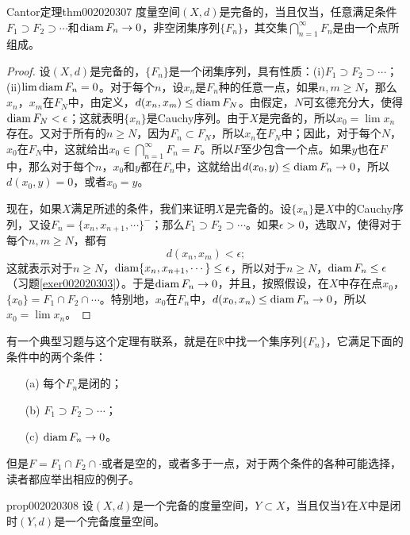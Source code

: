\begin{theorem}{Cantor定理}{thm002020307}
度量空间$(X, d)$是完备的，当且仅当，任意满足条件$F_1 \supset F_2 \supset \cdots$和$\operatorname{diam}{F_n} \to 0$，非空闭集序列$\{F_n\}$，其交集$\bigcap_{n=1}^{\infty}{F_n}$是由一个点所组成。
\end{theorem}

\begin{proof}
设$(X, d)$是完备的，$\{F_n\}$是一个闭集序列，具有性质：(i)$F_1 \supset F_2 \supset \cdots$；(ii)$\lim{\operatorname{diam}{F_n}} = 0$。对于每个$n$，设$x_n$是$F_n$种的任意一点，如果$n, m \ge N$，那么$x_n$，$x_m$在$F_N$中，由定义，$d(x_n, x_m) \le \operatorname{diam}{F_N}$。由假定，$N$可玄德充分大，使得$\operatorname{diam}{F_N} < \epsilon$；这就表明$\{x_n\}$是Cauchy序列。由于$X$是完备的，所以$x_0 = \lim{x_n}$存在。又对于所有的$n \ge N$，因为$F_n \subset F_N$，所以$x_n$在$F_N$中；因此，对于每个$N$，$x_0$在$F_N$中，这就给出$x_0 \in \bigcap_{n=1}^{\infty}{F_n} =F$。所以$F$至少包含一个点。如果$y$也在$F$中，那么对于每个$n$，$x_0$和$y$都在$F_n$中，这就给出$d(x_0, y) \le \operatorname{diam}{F_n} \to 0$，所以$d(x_0, y) = 0$，或者$x_0 = y$。

现在，如果$X$满足所述的条件，我们来证明$X$是完备的。设$\{x_n\}$是$X$中的Cauchy序列，又设$F_n = \{x_n, x_{n+1},\cdots\}^-$；那么$F_1 \supset F_2 \supset \cdots$。如果$\epsilon > 0$，选取$N$，使得对于每个$n, m \ge N$，都有
\[
d(x_n, x_m) < \epsilon;
\]
这就表示对于$n \ge N$，$\operatorname{diam}\{x_n, x_{n+1}, \cdots\} \le \epsilon$，所以对于$n \ge N$，$\operatorname{diam}{F_n} \le \epsilon$（习题\ref{exer002020303}）。于是$\operatorname{diam}{F_n} \to 0$，并且，按照假设，在$X$中存在点$x_0$，$\{x_0\} = F_1 \cap F_2 \cap \cdots$。特别地，$x_0$在$F_n$中，$d(x_0, x_n) \le \operatorname{diam}{F_n} \to 0$，所以$x_0 = \lim{x_n}$。
\end{proof}

有一个典型习题与这个定理有联系，就是在$\mathbb{R}$中找一个集序列$\{F_n\}$，它满足下面的条件中的两个条件：
\begin{enumerate}
\item[(a)]每个$F_n$是闭的；
\item[(b)]$F_1 \supset F_2 \supset \cdots$；
\item[(c)]$\operatorname{diam}{F_n} \to 0$。
\end{enumerate}
但是$F = F_1 \cap F_2 \cap \cdot$或者是空的，或者多于一点，对于两个条件的各种可能选择，读者都应举出相应的例子。

\begin{proposition}{}{prop002020308}
设$(X, d)$是一个完备的度量空间，$Y \subset X$，当且仅当$Y$在$X$中是闭时$(Y, d)$是一个完备度量空间。
\end{proposition}

